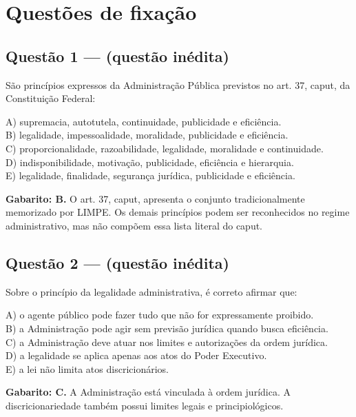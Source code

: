 \documentclass[11pt,a4paper]{article}
\begin{document}
\section*{Questões de fixação}

\subsection*{Questão 1 — (questão inédita)}

São princípios expressos da Administração Pública previstos no art. 37, caput, da Constituição Federal:

A) supremacia, autotutela, continuidade, publicidade e eficiência. \\ B) legalidade, impessoalidade, moralidade, publicidade e eficiência. \\ C) proporcionalidade, razoabilidade, legalidade, moralidade e continuidade. \\ D) indisponibilidade, motivação, publicidade, eficiência e hierarquia. \\ E) legalidade, finalidade, segurança jurídica, publicidade e eficiência.

\begin{alerta}
\textbf{Gabarito: B.} O art. 37, caput, apresenta o conjunto tradicionalmente memorizado por LIMPE. Os demais princípios podem ser reconhecidos no regime administrativo, mas não compõem essa lista literal do caput.
\end{alerta}

\subsection*{Questão 2 — (questão inédita)}

Sobre o princípio da legalidade administrativa, é correto afirmar que:

A) o agente público pode fazer tudo que não for expressamente proibido. \\ B) a Administração pode agir sem previsão jurídica quando busca eficiência. \\ C) a Administração deve atuar nos limites e autorizações da ordem jurídica. \\ D) a legalidade se aplica apenas aos atos do Poder Executivo. \\ E) a lei não limita atos discricionários.

\begin{alerta}
\textbf{Gabarito: C.} A Administração está vinculada à ordem jurídica. A discricionariedade também possui limites legais e principiológicos.
\end{alerta}
\end{document}

